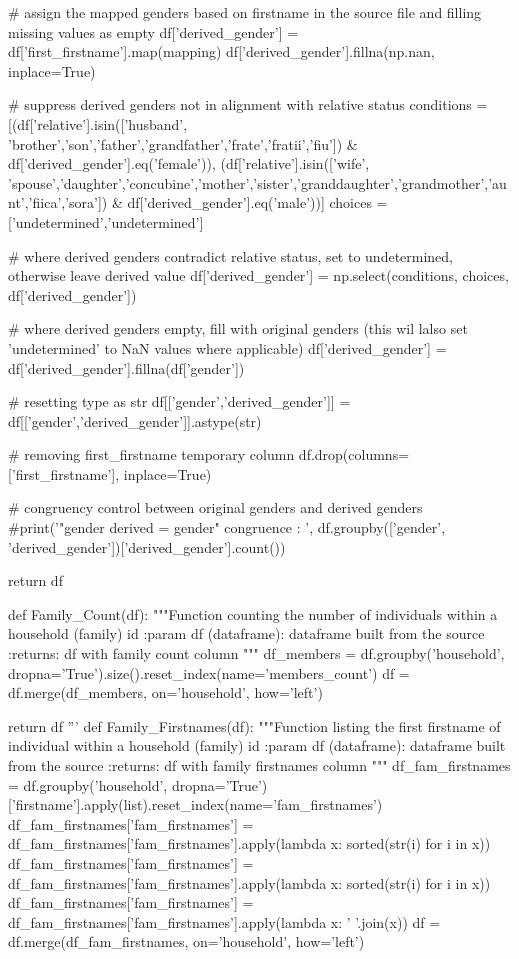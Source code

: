 \documentclass[a4paper,12pt,twoside]{book}
\begin{document}
\begin{python}
  # assign the mapped genders based on firstname in the source file and filling missing values as empty
  df['derived_gender'] = df['first_firstname'].map(mapping)
  df['derived_gender'].fillna(np.nan, inplace=True)
  
  # suppress derived genders not in alignment with relative status
  conditions = [(df['relative'].isin(['husband', 'brother','son','father','grandfather','frate','fratii','fiu']) & df['derived_gender'].eq('female')),
                (df['relative'].isin(['wife', 'spouse','daughter','concubine','mother','sister','granddaughter','grandmother','aunt','fiica','sora']) & df['derived_gender'].eq('male'))]
  choices = ['undetermined','undetermined']
  
  # where derived genders contradict relative status, set to undetermined, otherwise leave derived value
  df['derived_gender'] = np.select(conditions, choices, df['derived_gender'])
  
  # where derived genders empty, fill with original genders (this wil lalso set 'undetermined' to NaN values where applicable)
  df['derived_gender'] = df['derived_gender'].fillna(df['gender'])
    
  # resetting type as str
  df[['gender','derived_gender']] = df[['gender','derived_gender']].astype(str)
  
  # removing first_firstname temporary column
  df.drop(columns=['first_firstname'], inplace=True)

  # congruency control between original genders and derived genders
  #print('\n "gender derived = gender" congruence : \n', df.groupby(['gender', 'derived_gender'])['derived_gender'].count())

  return df

def Family_Count(df):
  """Function counting the number of individuals within a household (family) id
  :param df (dataframe): dataframe built from the source
  :returns: df with family count column
  """ 
  df_members = df.groupby('household', dropna='True').size().reset_index(name='members_count')
  df = df.merge(df_members, on='household', how='left')
 
  return df
'''
def Family_Firstnames(df):
  """Function listing the first firstname of individual within a household (family) id
  :param df (dataframe): dataframe built from the source
  :returns: df with family firstnames column
  """ 
  df_fam_firstnames = df.groupby('household', dropna='True')['firstname'].apply(list).reset_index(name='fam_firstnames')
  df_fam_firstnames['fam_firstnames'] = df_fam_firstnames['fam_firstnames'].apply(lambda x: sorted(str(i) for i in x))
  df_fam_firstnames['fam_firstnames'] = df_fam_firstnames['fam_firstnames'].apply(lambda x: sorted(str(i) for i in x))
  df_fam_firstnames['fam_firstnames'] = df_fam_firstnames['fam_firstnames'].apply(lambda x: ' '.join(x))
  df = df.merge(df_fam_firstnames, on='household', how='left')
 

\end{python}
\end{document}
